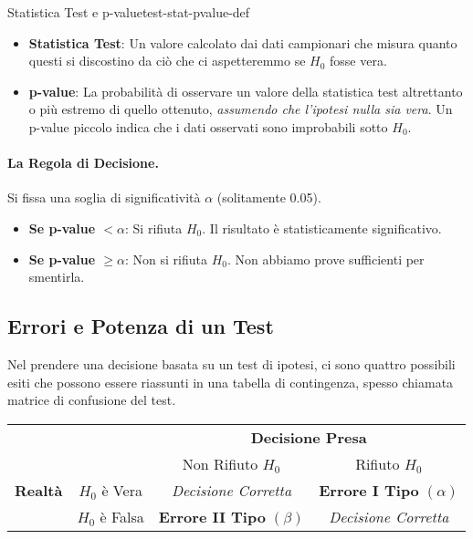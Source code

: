 \begin{definizione}{Statistica Test e p-value}{test-stat-pvalue-def}
\begin{itemize}
    \item \textbf{Statistica Test}: Un valore calcolato dai dati campionari che misura quanto questi si discostino da ciò che ci aspetteremmo se $H_0$ fosse vera.
    \item \textbf{p-value}: La probabilità di osservare un valore della statistica test altrettanto o più estremo di quello ottenuto, \textit{assumendo che l'ipotesi nulla sia vera}. Un p-value piccolo indica che i dati osservati sono improbabili sotto $H_0$.
\end{itemize}
\end{definizione}

\paragraph{La Regola di Decisione.} Si fissa una soglia di significatività $\alpha$ (solitamente 0.05).
\begin{itemize}
    \item \textbf{Se p-value $<\alpha$}: Si rifiuta $H_0$. Il risultato è statisticamente significativo.
    \item \textbf{Se p-value $\geq \alpha$}: Non si rifiuta $H_0$. Non abbiamo prove sufficienti per smentirla.
\end{itemize}

\subsection{Errori e Potenza di un Test}

Nel prendere una decisione basata su un test di ipotesi, ci sono quattro possibili esiti che possono essere riassunti in una tabella di contingenza, spesso chiamata matrice di confusione del test.

\begin{center}
    \begin{tabular}{cc|c|c|}
      & \multicolumn{1}{c}{} & \multicolumn{2}{c}{\textbf{Decisione Presa}}\\
      & \multicolumn{1}{c}{} & \multicolumn{1}{c}{Non Rifiuto $H_0$} & \multicolumn{1}{c}{Rifiuto $H_0$}\\
      \cline{3-4}
      \textbf{Realtà} & $H_0$ è Vera & \textit{Decisione Corretta} & \textbf{Errore I Tipo} $(\alpha)$ \\
      \cline{3-4}
                      & $H_0$ è Falsa & \textbf{Errore II Tipo} $(\beta)$ & \textit{Decisione Corretta} \\
      \cline{3-4}
    \end{tabular}
\end{center}


